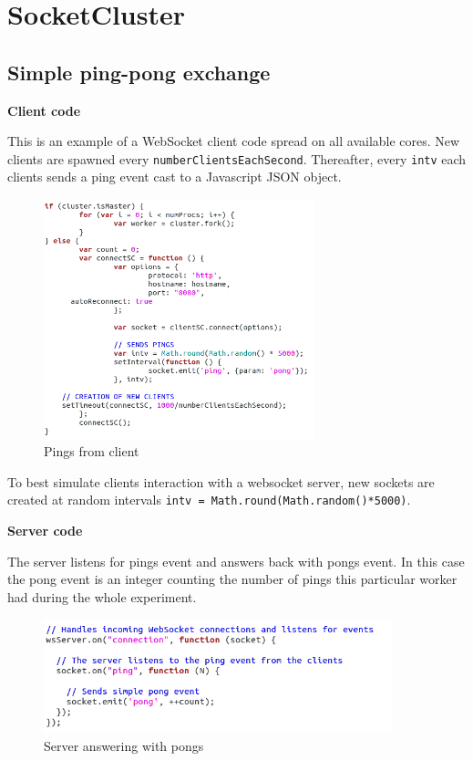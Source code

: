 \chapter{SocketCluster}
\label{SocketCluster}
\section{Simple ping-pong exchange}
\textbf{Client code}


This is an example of a WebSocket client code spread on all available cores.
New clients are spawned every \texttt{numberClientsEachSecond}. Thereafter,
every \texttt{intv} each clients sends a ping event cast to a Javascript JSON
object.

\begin{figure}[H]
	\centering
		\includegraphics[width=0.7\textwidth]{./Figures/WS_client_simplePing.png}
	\caption[WS_client_simplePing]{Pings from client}
	\label{fig:WS_client_simplePing}
\end{figure}

To best simulate clients interaction with a websocket server, new sockets are
created at random intervals \texttt{intv = Math.round(Math.random()*5000)}.

\textbf{Server code}

The server listens for pings event and answers back with pongs event. In this
case the pong event is an integer counting the number of pings this particular
worker had during the whole experiment.

\begin{figure}[H]
	\centering
    \includegraphics[width=0.9\textwidth]{./Figures/WS_server_simplePong.png}
	\caption[WS_server_simplePong]{Server answering with pongs}
	\label{fig:WS_server_simplePong}
\end{figure}

